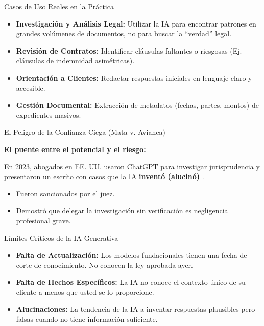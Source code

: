 \documentclass[aspectratio=169]{beamer}
\begin{document}
\begin{frame}[fragile]{Casos de Uso Reales en la Práctica}


\begin{itemize}
  \item \textbf{Investigación y Análisis Legal:} Utilizar la IA para encontrar patrones en grandes volúmenes de documentos, no para buscar la ``verdad'' legal.
  \item \textbf{Revisión de Contratos:} Identificar cláusulas faltantes o riesgosas (Ej. cláusulas de indemnidad asimétricas).
  \item \textbf{Orientación a Clientes:} Redactar respuestas iniciales en lenguaje claro y accesible.
  \item \textbf{Gestión Documental:} Extracción de metadatos (fechas, partes, montos) de expedientes masivos.
\end{itemize}
\end{frame}



\begin{frame}[fragile]{El Peligro de la Confianza Ciega (Mata v. Avianca)}


\textbf{El puente entre el potencial y el riesgo:}

En 2023, abogados en EE. UU. usaron ChatGPT para investigar jurisprudencia y presentaron un escrito con casos que la IA \textbf{inventó (alucinó)} \cite{matavavianca}.

\begin{itemize}
  \item Fueron sancionados por el juez.
  \item Demostró que delegar la investigación sin verificación es negligencia profesional grave.
\end{itemize}
\end{frame}



\begin{frame}[fragile]{Límites Críticos de la IA Generativa}


\begin{itemize}
  \item \textbf{Falta de Actualización:} Los modelos fundacionales tienen una fecha de corte de conocimiento. No conocen la ley aprobada ayer.
  \item \textbf{Falta de Hechos Específicos:} La IA no conoce el contexto único de su cliente a menos que usted se lo proporcione.
  \item \textbf{Alucinaciones:} La tendencia de la IA a inventar respuestas plausibles pero falsas cuando no tiene información suficiente.
\end{itemize}
\end{frame}
\end{document}

